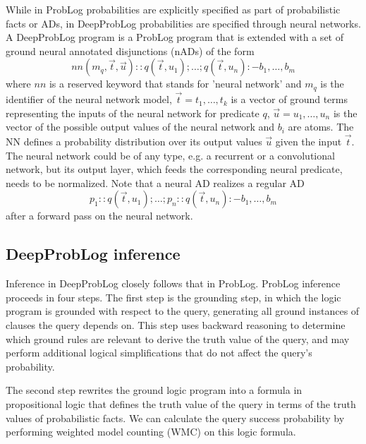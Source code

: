 While in ProbLog probabilities are explicitly specified as part of probabilistic facts or ADs, in DeepProbLog probabilities are specified through neural networks.
A DeepProbLog program is a ProbLog program that is extended with a set of ground neural annotated disjunctions (nADs) of the form
\begin{equation}
    nn(m_q, \vec{t}, \vec{u}) :: q(\vec{t}, u_1); \dots; q(\vec{t}, u_n) :- b_1, \dots, b_m
\end{equation}
where $nn$ is a reserved keyword that stands for 'neural network' and $m_q$ is the identifier of the neural network model, $\vec{t} = t_1, \dots, t_k$ is a vector of ground terms representing the inputs of the neural network for predicate $q$, $\vec{u} = u_1, \dots, u_n$ is the vector of the possible output values of the neural network and $b_i$ are atoms. The NN defines a probability distribution over its output values $\vec{u}$ given the input $\vec{t}$.
The neural network could be of any type, e.g. a recurrent or a convolutional network, but its output layer, which feeds the corresponding neural predicate, needs to be normalized.
Note that a neural AD realizes a regular AD 
\begin{equation}
    p_1 :: q(\vec{t}, u_1); \dots; p_n :: q(\vec{t}, u_n) :- b_1, \dots, b_m
\end{equation}
after a forward pass on the neural network.

\subsection{DeepProbLog inference}
Inference in DeepProbLog closely follows that in ProbLog. ProbLog inference proceeds in four steps. The first step is the grounding step, in which the logic program is grounded with respect to the query, generating all ground instances of clauses the query depends on. This step uses backward reasoning to determine which ground rules are relevant to derive the truth value of the query, and may perform additional logical simplifications that do not affect the query's probability.

The second step rewrites the ground logic program into a formula in propositional logic that defines the truth value of the query in terms of the truth values of probabilistic facts. We can calculate the query success probability by performing weighted model counting (WMC) on this logic formula.

